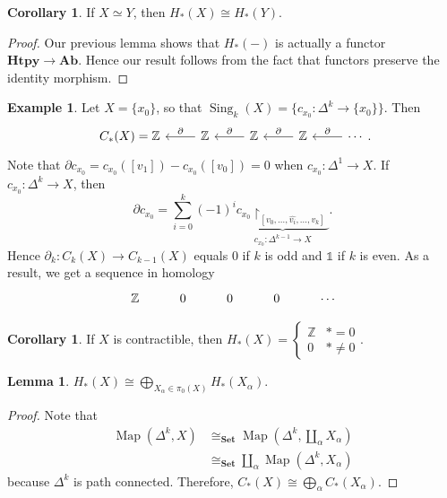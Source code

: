 \documentclass[10pt,letterpaper,cm]{nupset}
\theoremstyle{definition}
\newtheorem{exmp}[definition]{Example}
\theoremstyle{theorem}
\newtheorem{lemma}[definition]{Lemma}
\newtheorem{corollary}[definition]{Corollary}
\theoremstyle{remark}
\newcommand{\Z}{\mathbb Z}
\newcommand{\1}{\mathbb{1}}
\newcommand{\0}{\vec 0}
\DeclareMathOperator{\map}{Map}
\DeclareMathOperator{\sing}{Sing}
\begin{document}
\begin{corollary}
If $X \simeq Y$, then $H_{\ast}(X) \cong H_{\ast}(Y)$.
\end{corollary}
\begin{proof}
Our previous lemma shows that $H_{\ast}(-)$ is actually a functor $\mathbf{Htpy} \to  \mathbf{Ab}$. Hence our result follows from the fact that functors preserve the identity morphism. 
\end{proof}


\begin{exmp}
Let $X =\{x_0\}$, so that $\sing_k(X) = \{c_{x_0} : \Delta^k \to \{x_0\}\}$. Then
\[
\begin{tikzcd}
C_{\ast}(X) =  \Z & \Z \arrow[l, "\partial"'] & \Z \arrow[l, "\partial"'] & \Z \arrow[l, "\partial"'] & \cdots \arrow[l, "\partial"']
\end{tikzcd}.
\]  Note that $\partial{c_{x_0}} = c_{x_0}([v_1]) - c_{x_0}([v_0]) =0$ when $c_{x_0} : \Delta^1 \to X$. If $c_{x_0} : \Delta^k \to X$, then $$\partial{c_{x_0}} = \sum_{i=0}^k (-1)^i \underbrace{c_{x_0}\restriction_{[v_0, \ldots, \hat{v_i}, \ldots, v_k]}}_{c_{x_0} : \Delta^{k-1} \to X}.$$ Hence $\partial_k : C_k(X) \to C_{k-1}(X)$ equals $0$ if $k$ is odd and $\1$ if $k$ is even. As a result, we get a sequence in homology 
\[
\begin{tikzcd}
\Z & 0 & 0 & 0 & \cdots
\end{tikzcd}
\]
\end{exmp}

\begin{corollary}
If $X$ is contractible, then $H_{\ast}(X) = \begin{cases} \Z & \ast =0 \\ 0 & \ast \ne 0 \end{cases}.$
\end{corollary}

\begin{lemma}
$H_{\ast}(X) \cong \bigoplus_{X_{\alpha} \in \pi_0(X)} H_{\ast}(X_{\alpha})$. 
\end{lemma}
\begin{proof} Note that
\begin{align*}
\map(\Delta^k, X) & \cong_{\mathbf{Set}} \map(\Delta^k, \coprod_{\alpha} X_{\alpha})
\\ & \cong_{\mathbf{Set}} \coprod_{\alpha} \map(\Delta^k, X_{\alpha})
\end{align*}
because $\Delta^k$ is path connected. Therefore, $C_{\ast}(X) \cong \bigoplus_{\alpha} C_{\ast}(X_{\alpha})$.
\end{proof}
\end{document}
